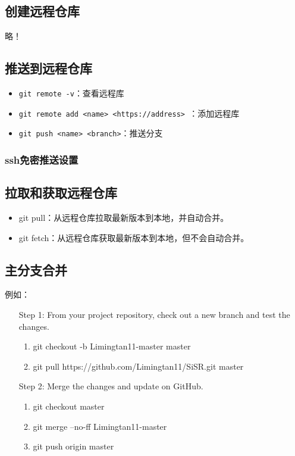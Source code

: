 \subsection{创建远程仓库}

略！

\subsection{推送到远程仓库}
\begin{itemize}
\item \verb|git remote -v|：查看远程库
\item \verb|git remote add <name> <https://address> |：添加远程库
\item \verb|git push <name> <branch>|：推送分支
\end{itemize}

\subsubsection{ssh免密推送设置}




\subsection{拉取和获取远程仓库}
\begin{itemize}
\item git pull：从远程仓库拉取最新版本到本地，并自动合并。
\item git fetch：从远程仓库获取最新版本到本地，但不会自动合并。
\end{itemize}


\subsection{主分支合并}
例如：
\begin{itemize}
\item[Step 1:] From your project repository, check out a new branch and test the changes.
\begin{enumerate}
\item git checkout -b Limingtan11-master master

\item git pull https://github.com/Limingtan11/SiSR.git master
\end{enumerate}

\item [Step 2:] Merge the changes and update on GitHub.
\begin{enumerate}
\item  git checkout master

\item git merge --no-ff Limingtan11-master

\item git push origin master
\end{enumerate}
\end{itemize}








